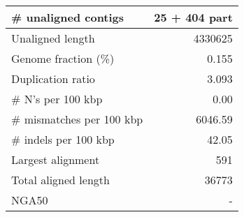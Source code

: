 \documentclass[12pt,a4paper]{article}
\begin{document}
\begin{table}[ht]
\begin{center}
\begin{tabular}{|l*{1}{|r}|}
\# unaligned contigs & 25 + 404 part \\ \hline
Unaligned length & 4330625 \\ \hline
Genome fraction (\%) & 0.155 \\ \hline
Duplication ratio & 3.093 \\ \hline
\# N's per 100 kbp & 0.00 \\ \hline
\# mismatches per 100 kbp & 6046.59 \\ \hline
\# indels per 100 kbp & 42.05 \\ \hline
Largest alignment & 591 \\ \hline
Total aligned length & 36773 \\ \hline
NGA50 & - \\ \hline
\end{tabular}
\end{center}
\end{table}
\end{document}
